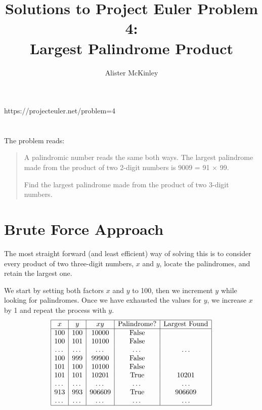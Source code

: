 \documentclass{article}
\title{Solutions to Project Euler Problem 4:\\Largest Palindrome Product}
\author{Alister McKinley}
\date{}
\begin{document}
\maketitle
\begin{center}
    https://projecteuler.net/problem=4
\end{center}

\section*{}
The problem reads:

\begin{quote}
    A palindromic number reads the same both ways. The largest palindrome made from the product of two 2-digit numbers is 9009 = 91 \(\times\) 99.
    
    Find the largest palindrome made from the product of two 3-digit numbers.
\end{quote}

\section*{Brute Force Approach}
The most straight forward (and least efficient) way of solving this is to consider every product of two three-digit numbers, \(x\) and \(y\), locate the palindromes, and retain the largest one.

We start by setting both factors \(x\) and \(y\) to 100, then we increment \(y\) while looking for palindromes. Once we have exhausted the values for \(y\), we increase \(x\) by 1 and repeat the process with \(y\).
\[\begin{array}{|c|c|c|c|c|}
    \hline
    x & y & xy & \text{Palindrome?} & \text{Largest Found} \\
    \hline
    100 & 100 & 10000 & \text{False} & \\
    100 & 101 & 10100 & \text{False} & \\
    \dots & \dots & \dots & \dots & \dots \\
    100 & 999 & 99900 & \text{False} & \\
    101 & 100 & 10100 & \text{False} & \\
    101 & 101 & 10201 & \text{True} & 10201 \\
    \dots & \dots & \dots & \dots & \dots \\
    913 & 993 & 906609 & \text{True} & 906609 \\
    \dots & \dots & \dots & \dots & \dots \\
    \hline
\end{array}\]
\end{document}
